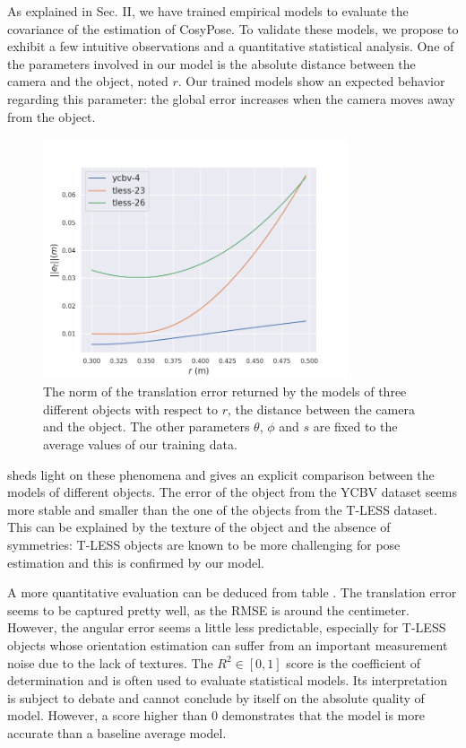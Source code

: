 As explained in Sec. II, we have trained empirical models to evaluate the covariance of the estimation of CosyPose. 
To validate these models, we propose to exhibit a few intuitive observations and a quantitative statistical analysis. 
One of the parameters involved in our model is the absolute distance between the camera and the object, noted $r$. 
Our trained models show an expected behavior regarding this parameter: the global error increases when the camera moves away from the object. 
%
\begin{figure}[h]
  \centering 
  \includegraphics[width=0.8\textwidth]{figures/cosyslam/empirical_err.png}
  \caption{The norm of the translation error returned by the models of three different objects with respect to $r$, the distance between the camera and the object. 
            The other parameters $\theta$, $\phi$ and $s$ are fixed to the average values of our training data. }
  \label{fig:empirical_err}
\end{figure}

 sheds light on these phenomena and gives an explicit comparison between the models of different objects. 
The error of the object from the YCBV dataset seems more stable and smaller than the one of the objects from the T-LESS dataset. 
This can be explained by the texture of the object and the absence of symmetries: T-LESS objects are known to be more challenging 
for pose estimation and this is confirmed by our model.

A more quantitative evaluation can be deduced from table . The translation error seems to be captured pretty well,
 as the RMSE is around the centimeter. However, the angular error seems a little less predictable, especially for T-LESS objects whose orientation 
 estimation can suffer from an important measurement noise due to the lack of textures. The $R^2\in[0,1]$ score is the coefficient of determination 
 and is often used to evaluate statistical models. Its interpretation is subject to debate and cannot conclude by itself on the absolute quality of model. 
 However, a score higher than 0 demonstrates that the model is more accurate than a baseline average model.

